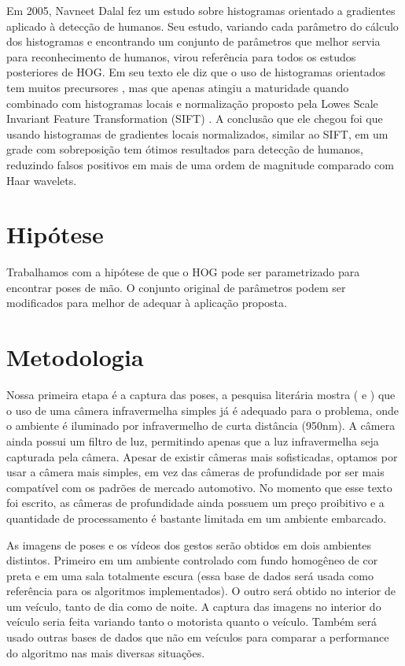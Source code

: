 Em 2005, Navneet Dalal \cite{dalal} fez um estudo sobre histogramas orientado a gradientes aplicado à detecção de humanos. Seu estudo, variando cada parâmetro do cálculo dos histogramas e encontrando um conjunto de parâmetros que melhor servia para reconhecimento de humanos, virou referência para todos os estudos posteriores de HOG. Em seu texto ele diz que o uso de histogramas orientados tem muitos precursores \cite{ref3} \cite{ref4}, mas que apenas atingiu a maturidade quando combinado com histogramas locais e normalização proposto pela Lowes Scale Invariant Feature Transformation (SIFT) \cite{ref15}. A conclusão que ele chegou foi que usando histogramas de gradientes locais normalizados, similar ao SIFT, em um grade com sobreposição tem ótimos resultados para detecção de humanos, reduzindo falsos positivos em mais de uma ordem de magnitude comparado com Haar wavelets.

\section{Hipótese}

Trabalhamos com a hipótese de que o HOG pode ser parametrizado para encontrar poses de mão. O conjunto original de parâmetros podem ser modificados para melhor de adequar à aplicação proposta.

\section{Metodologia}

Nossa primeira etapa é a captura das poses, a pesquisa literária mostra (\cite{ref2} e \cite{ref1}) que o uso de uma câmera infravermelha simples já é adequado para o problema, onde o ambiente é iluminado por infravermelho de curta distância (950nm). A câmera ainda possui um filtro de luz, permitindo apenas que a luz infravermelha seja capturada pela câmera. Apesar de existir câmeras mais sofisticadas, optamos por usar a câmera mais simples, em vez das câmeras de profundidade por ser mais compatível com os padrões de mercado automotivo. No momento que esse texto foi escrito, as câmeras de profundidade ainda possuem um preço proibitivo e a quantidade de processamento é bastante limitada em um ambiente embarcado.

As imagens de poses e os vídeos dos gestos serão obtidos em  dois ambientes distintos. Primeiro em um ambiente controlado com fundo homogêneo de cor preta e em uma sala totalmente escura (essa base de dados será usada como referência para os algoritmos implementados). O outro será obtido no interior de um veículo, tanto de dia como de noite. A captura das imagens no interior do veículo seria feita variando tanto o motorista quanto o veículo. Também será usado outras bases de dados que não em veículos para comparar a performance do algoritmo nas mais diversas situações.

